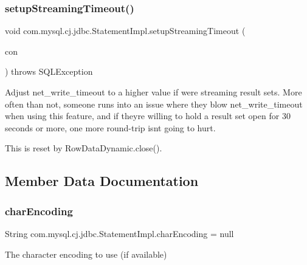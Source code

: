 \subsubsection{\texorpdfstring{setup\+Streaming\+Timeout()}{setupStreamingTimeout()}}
{\footnotesize\ttfamily void com.\+mysql.\+cj.\+jdbc.\+Statement\+Impl.\+setup\+Streaming\+Timeout (\begin{DoxyParamCaption}\item[{\mbox{\hyperlink{interfacecom_1_1mysql_1_1cj_1_1jdbc_1_1_jdbc_connection}{Jdbc\+Connection}}}]{con }\end{DoxyParamCaption}) throws S\+Q\+L\+Exception\hspace{0.3cm}{\ttfamily [protected]}}

Adjust net\+\_\+write\+\_\+timeout to a higher value if we\textquotesingle{}re streaming result sets. More often than not, someone runs into an issue where they blow net\+\_\+write\+\_\+timeout when using this feature, and if they\textquotesingle{}re willing to hold a result set open for 30 seconds or more, one more round-\/trip isn\textquotesingle{}t going to hurt.

This is reset by Row\+Data\+Dynamic.\+close(). 

\subsection{Member Data Documentation}
\mbox{\label{classcom_1_1mysql_1_1cj_1_1jdbc_1_1_statement_impl_a013d9c1b743d83cb092f7175327a8455}} 
\subsubsection{\texorpdfstring{char\+Encoding}{charEncoding}}
{\footnotesize\ttfamily String com.\+mysql.\+cj.\+jdbc.\+Statement\+Impl.\+char\+Encoding = null\hspace{0.3cm}{\ttfamily [protected]}}

The character encoding to use (if available) \mbox{\label{classcom_1_1mysql_1_1cj_1_1jdbc_1_1_statement_impl_a0d65d87b997eec0472cc8f07f376cfe0}} 

